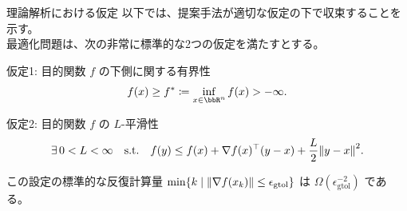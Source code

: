 \documentclass[dvipdfmx,12pt,aspectratio=169]{beamer}
\newcommand{\defeq}{\coloneqq}
\newcommand{\gtol}{\epsilon_{\mathrm{gtol}}}
\begin{document}
\begin{frame}{理論解析における仮定}
  以下では、提案手法が適切な仮定の下で収束することを示す。\\[1em]

  最適化問題は、次の非常に標準的な2つの仮定を満たすとする。
  \begin{block}{仮定1: 目的関数 $f$ の下側に関する有界性}
    \begin{equation*}
      f(x) \ge f^* \defeq \inf_{x \in \bbR^n} f(x) > -\infty.
    \end{equation*}
  \end{block}
  \begin{block}{仮定2: 目的関数 $f$ の $L$-平滑性}
    \begin{equation*}
      \exists\, 0< L < \infty \quad\text{s.t.}\quad f(y) \le f(x) + \nabla f(x)^\top (y - x) + \frac{L}{2} \norm{y - x}^2.
    \end{equation*}
  \end{block}
  \vspace{1em}

  この設定の標準的な反復計算量 $\min\{k \mid \norm{\nabla f(x_k)} \le \gtol\}$ は $\Omega(\gtol^{-2})$ である。
\end{frame}
\end{document}
